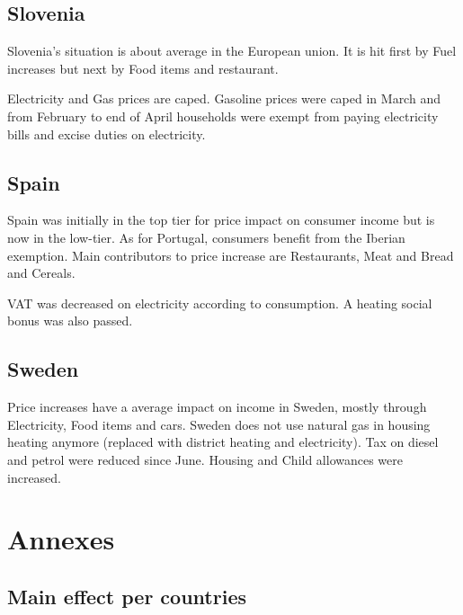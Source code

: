 \documentclass[
  9pt,
  a4paper,
  numbers=noendperiod,
  DIV=12]{scrartcl}
\begin{document}
\hypertarget{slovenia}{%
\subsection{Slovenia}\label{slovenia}}

Slovenia's situation is about average in the European union. It is hit
first by Fuel increases but next by Food items and restaurant.

Electricity and Gas prices are caped. Gasoline prices were caped in
March and from February to end of April households were exempt from
paying electricity bills and excise duties on electricity.

\hypertarget{spain}{%
\subsection{Spain}\label{spain}}

Spain was initially in the top tier for price impact on consumer income
but is now in the low-tier. As for Portugal, consumers benefit from the
Iberian exemption. Main contributors to price increase are Restaurants,
Meat and Bread and Cereals.

VAT was decreased on electricity according to consumption. A heating
social bonus was also passed.

\hypertarget{sweden}{%
\subsection{Sweden}\label{sweden}}

Price increases have a average impact on income in Sweden, mostly
through Electricity, Food items and cars. Sweden does not use natural
gas in housing heating anymore (replaced with district heating and
electricity). Tax on diesel and petrol were reduced since June. Housing
and Child allowances were increased.

\newpage

\hypertarget{annexes}{%
\section{Annexes}\label{annexes}}

\hypertarget{main-effect-per-countries}{%
\subsection{Main effect per countries}\label{main-effect-per-countries}}
\end{document}
